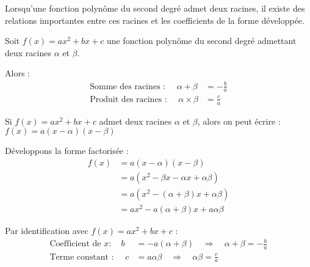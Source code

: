 \documentclass[11pt,a4paper]{article}
\begin{document}
	Lorsqu'une fonction polynôme du second degré admet deux racines, il existe des relations importantes entre ces racines et les coefficients de la forme développée.
	
	\begin{propriete}
		Soit $f(x) = ax^2 + bx + c$ une fonction polynôme du second degré admettant deux racines $\alpha$ et $\beta$.
		
		Alors :
		\begin{align*}
			\text{Somme des racines : } \quad \alpha + \beta &= -\frac{b}{a} \\
			\text{Produit des racines : } \quad \alpha \times \beta &= \frac{c}{a}
		\end{align*}
	\end{propriete}
	
	\begin{demonstration}
		Si $f(x) = ax^2 + bx + c$ admet deux racines $\alpha$ et $\beta$, alors on peut écrire :
		$f(x) = a(x - \alpha)(x - \beta)$
		
		Développons la forme factorisée :
		\begin{align*}
			f(x) &= a(x - \alpha)(x - \beta) \\
			&= a(x^2 - \beta x - \alpha x + \alpha \beta) \\
			&= a(x^2 - (\alpha + \beta)x + \alpha \beta) \\
			&= ax^2 - a(\alpha + \beta)x + a\alpha \beta
		\end{align*}
		
		Par identification avec $f(x) = ax^2 + bx + c$ :
		\begin{align*}
			\text{Coefficient de } x : \quad b &= -a(\alpha + \beta) \quad \Rightarrow \quad \alpha + \beta = -\frac{b}{a} \\
			\text{Terme constant : } \quad c &= a\alpha \beta \quad \Rightarrow \quad \alpha \beta = \frac{c}{a}
		\end{align*}
	\end{demonstration}
	
\end{document}
